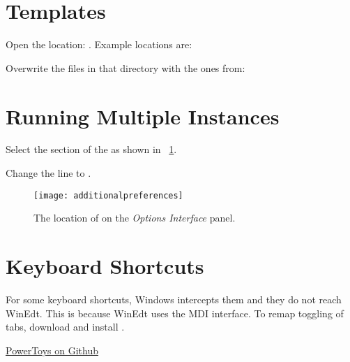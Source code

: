 \section{Templates}
   \begin{numberedlist}
       \item Open the location: .  Example locations are:
       \begin{plainlist}
           \item {}
           \item {}
       \end{plainlist}
       \item Overwrite the files in that directory with the ones from:
       \begin{plainlist}
           \item {}
       \end{plainlist}
   \end{numberedlist}

\section{Running Multiple Instances}
\begin{numberedlist}
	\item Select the  section of the  as shown in \figurename~\ref{fig:additionalpreferences}.
	\item Change the line  to .
\end{numberedlist}
\begin{figure}
	\centering
	\texttt{[image: additionalpreferences]}
	\caption{The location of  on the \textit{Options Interface} panel.}
	\label{fig:additionalpreferences}
\end{figure}


\section{Keyboard Shortcuts}
For some keyboard shortcuts, Windows intercepts them and they do not reach WinEdt.  This is because WinEdt uses the MDI interface.  To remap toggling of tabs, download and install .
\begin{plainlist}
	\item \href{https://github.com/microsoft/PowerToys}{PowerToys on Github}
\end{plainlist}

